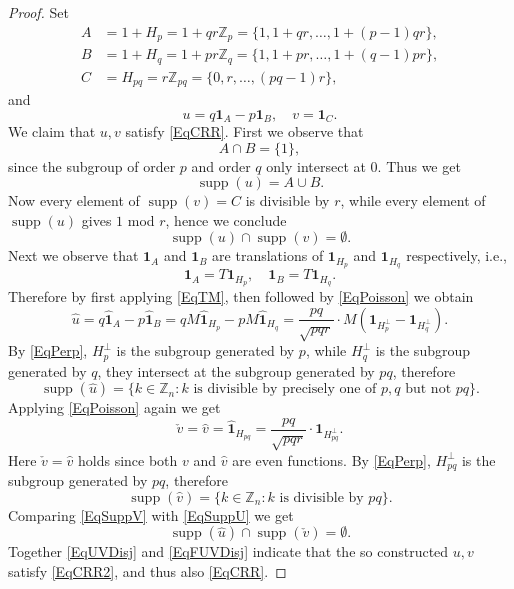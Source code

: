 \documentclass[10pt,a4paper]{amsart}
\DeclareMathOperator{\supp}{supp}
\newcommand{\F}[1]{\widehat{\mathbf 1}_{#1}}
\begin{document}
\begin{proof}
Set
\begin{align*}
A&=1+H_p=1+qr\mathbb Z_p=\{1,1+qr,\ldots,1+(p-1)qr\}, \\
B&=1+H_q=1+pr\mathbb Z_q=\{1,1+pr,\ldots,1+(q-1)pr\}, \\
C&=H_{pq}=r\mathbb Z_{pq}=\{0,r,\ldots,(pq-1)r\},
\end{align*}
and
$$u=q\mathbf 1_A-p\mathbf 1_B, \quad v=\mathbf 1_C.$$
We claim that $u,v$ satisfy \eqref{EqCRR}. First we observe that 
$$A\cap B=\{1\},$$
since the subgroup of order $p$ and order $q$ only intersect at $0$. Thus we get 
$$\supp(u)=A\cup B.$$
Now every element of $\supp(v)=C$ is divisible by $r$, while every element of $\supp(u)$ gives $1$ mod $r$, hence we conclude
\begin{equation} \label{EqUVDisj}
\supp(u)\cap\supp(v)=\emptyset.
\end{equation} 
Next we observe that $\mathbf 1_A$ and $\mathbf 1_B$ are translations of $\mathbf 1_{H_p}$ and $\mathbf 1_{H_q}$ respectively, i.e.,
$$\mathbf 1_A=T\mathbf 1_{H_p}, \quad \mathbf 1_B=T\mathbf 1_{H_q}.$$
Therefore by first applying \eqref{EqTM}, then followed by \eqref{EqPoisson} we obtain
$$\hat u=q\F{A}-p\F{B}=qM\F{H_p}-pM\F{H_q}=\frac{pq}{\sqrt{pqr}}\cdot M(\mathbf 1_{H_p^{\perp}}-\mathbf 1_{H_q^{\perp}}).$$
By \eqref{EqPerp}, $H_p^{\perp}$ is the subgroup generated by $p$, while $H_q^{\perp}$ is the subgroup generated by $q$, they intersect at the subgroup generated by $pq$, therefore
\begin{equation} \label{EqSuppU}
\supp(\hat u)=\{k\in\mathbb Z_n: k \text{ is divisible by precisely one of } p,q \text{ but not } pq\}.
\end{equation}
Applying \eqref{EqPoisson} again we get
$$\check v=\hat v=\F{H_{pq}}=\frac{pq}{\sqrt{pqr}}\cdot \mathbf 1_{H_{pq}^{\perp}}.$$
Here $\check v=\hat v$ holds since both $v$ and $\hat v$ are even functions. By \eqref{EqPerp}, $H_{pq}^{\perp}$ is the subgroup generated by $pq$, therefore
\begin{equation} \label{EqSuppV}
\supp(\hat v)=\{k\in\mathbb Z_n: k \text{ is divisible by } pq\}.
\end{equation} 
Comparing \eqref{EqSuppV} with \eqref{EqSuppU} we get
\begin{equation} \label{EqFUVDisj}
\supp(\hat u)\cap\supp(\check v)=\emptyset.
\end{equation} 
Together \eqref{EqUVDisj} and \eqref{EqFUVDisj} indicate that the so constructed $u,v$ satisfy \eqref{EqCRR2}, and thus also \eqref{EqCRR}. 
\end{proof}
\end{document}
